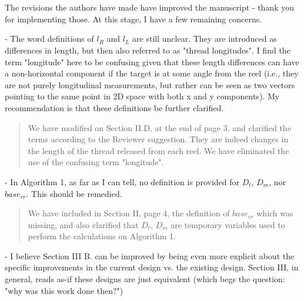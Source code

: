 \documentclass[journal,onecolumn,12pt]{IEEEtran}
\begin{document}
\section*{}

The revisions the authors have made have improved the manuscript - thank you for implementing those. At this stage, I have a few remaining concerns.

- The word definitions of $l_R$ and $l_L$ are still unclear. They are introduced as differences in length, but then also referred to as "thread longitudes". I find the term "longitude" here to be confusing given that these length differences can have a non-horizontal component if the target is at some angle from the reel (i.e., they are not purely longitudinal measurements, but rather can be seen as two vectors pointing to the same point in 2D space with both x and y components). My recommendation is that these definitions be further clarified.

\vspace{10pt} 
\begin{quotation}
{\color{blue}
We have modified on Section II.D, at the end of page 3, and clarified the terms according to the Reviewer suggestion.  They are indeed changes in the length of the thread released from each reel.  We have eliminated the use of the confusing term "longitude".  
}
\end{quotation}
\vspace{10pt} 


- In Algorithm 1, as far as I can tell, no definition is provided for $D_t$, $D_m$, nor $base_{vr}$. This should be remedied.

\vspace{10pt} 
\begin{quotation}
{\color{blue}
We have included in Section II, page 4, the definition of $base_{vr}$ which was missing, and also clarified that $D_t$, $D_m$ are temporary variables used to perform the calculations on Algorithm 1.
}
\end{quotation}
\vspace{10pt} 

- I believe Section III B. can be improved by being even more explicit about the specific improvements in the current design vs. the existing design. Section III, in general, reads as-if these designs are just equivalent (which begs the question: "why was this work done then?")
\end{document}
